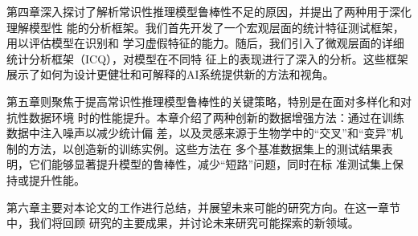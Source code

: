 第四章深入探讨了解析常识性推理模型鲁棒性不足的原因，并提出了两种用于深化理解模型性
能的分析框架。我们首先开发了一个宏观层面的统计特征测试框架，用以评估模型在识别和
学习虚假特征的能力。随后，我们引入了微观层面的详细统计分析框架（ICQ），对模型在不同特
征上的表现进行了深入的分析。这些框架展示了如何为设计更健壮和可解释的AI系统提供新的方法和视角。

第五章则聚焦于提高常识性推理模型鲁棒性的关键策略，特别是在面对多样化和对抗性数据环境
时的性能提升。本章介绍了两种创新的数据增强方法：通过在训练数据中注入噪声以减少统计偏
差，以及灵感来源于生物学中的``交叉''和``变异''机制的方法，以创造新的训练实例。这些方法在
多个基准数据集上的测试结果表明，它们能够显著提升模型的鲁棒性，减少``短路''问题，同时在标
准测试集上保持或提升性能。

第六章主要对本论文的工作进行总结，并展望未来可能的研究方向。在这一章节中，我们将回顾
研究的主要成果，并讨论未来研究可能探索的新领域。

\newpage
\null
\newpage
